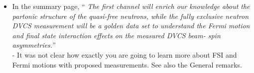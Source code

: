 \begin{itemize}
\item In the summary page, ``\textit{ The first channel will enrich our knowledge about the partonic structure of the quasi-free neutrons, while the fully exclusive neutron DVCS measurement will be a golden data set to understand the Fermi motion and final state interaction effects on the measured DVCS beam-
spin asymmetries.''}\\
- It was not clear how exactly you are going to learn more about FSI and Fermi motions with proposed measurements. See also the General remarks.

\end{itemize}
 


